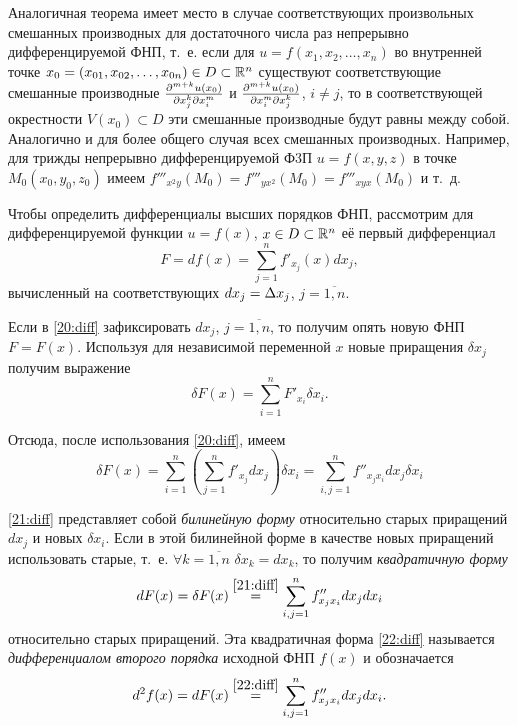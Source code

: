 \documentclass[../../main.tex]{subfiles}
\begin{document}
	\begin{rem}
		Аналогичная теорема имеет место в случае соответствующих 
		произвольных смешанных производных для достаточного числа 
		раз непрерывно дифференцируемой ФНП, т.~е. если для 
		$u = f\left(x_1, x_2,\dots, x_n\right)$ во внутренней 
		точке $x_0 = \left(x_{01}, x_{02},\dots, x_{0n}\right)
		\in D\subset \mathbb{R}^n$ существуют соответствующие смешанные 
		производные $\frac{\partial ^{m+k}u\left(x_0\right)}{\partial x_j^k\partial x_i^m}$ и 
		$\frac{\partial ^{m+k}u\left(x_0\right)}{\partial x_i^m\partial x_j^k}$, $i\ne j$, 
		то в соответствующей окрестности $V\left(x_0\right)\subset D$ эти 
		смешанные производные будут равны между собой. Аналогично и для более 
		общего случая всех смешанных производных. Например, для трижды 
		непрерывно дифференцируемой Ф3П $u=f\left(x, y, z\right)$ в точке 
		$M_0\left(x_0, y_0, z_0\right)$ имеем
		$f'''_{x^2y}\left(M_0\right) = f'''_{yx^2}\left(M_0\right) = 
		f'''_{xyx}\left(M_0\right)$ и т.~д.
	\end{rem}

	Чтобы определить дифференциалы высших порядков ФНП, рассмотрим для 
	дифференцируемой функции $u=f\left(x\right)$, $x\in D\subset \mathbb{R}^n$ 
	её первый дифференциал
	\begin{equation}
		F = df\left(x\right) = \sum_{j = 1}^nf'_{x_j}\left(x\right)dx_j,
		\label{20:diff}
	\end{equation}
	вычисленный на соответствующих $dx_j = \Delta x_j$, $j = \overline{1, n}$.
	
	Если в \eqref{20:diff} зафиксировать $dx_j$, $j = \overline{1, n}$, то 
	получим опять новую ФНП $F = F(x)$. Используя для независимой переменной 
	$x$ новые приращения $\delta x_j$ получим выражение
	\[\delta F(x) = \sum_{i = 1}^nF'_{x_i}\delta x_i.\]
	
	Отсюда, после использования \eqref{20:diff}, имеем
	\begin{equation}
		\delta F(x) = \sum_{i = 1}^n\left(\sum_{j = 1}^nf'_{x_j}dx_j\right)
		\delta x_i = \sum_{i, j = 1}^nf''_{x_jx_i}dx_j\delta x_i
		\label{21:diff}
	\end{equation}
	
	\eqref{21:diff} представляет собой \emph{билинейную форму} относительно 
	старых приращений $dx_j$ и новых $\delta x_i$. Если в этой билинейной форме 
	в качестве новых приращений использовать старые, т.~е. 
	$\forall k = \overline{1, n}$ $\delta x_k = dx_k$, то получим 
	\emph{квадратичную форму}
	\begin{equation}
		dF(x) = \delta F(x) \overset{\eqref{21:diff}}{=} 
		\sum_{i, j = 1}^nf''_{x_jx_i}dx_jdx_i
		\label{22:diff}
	\end{equation}
	относительно старых приращений. Эта квадратичная форма \eqref{22:diff} 
	называется \emph{дифференциалом второго порядка} исходной ФНП $f(x)$ 
	и обозначается
	\[d^2f(x) = dF(x) \overset{\eqref{22:diff}}{=} 
	\sum_{i, j = 1}^nf''_{x_jx_i}dx_jdx_i.\]
		
\end{document}
